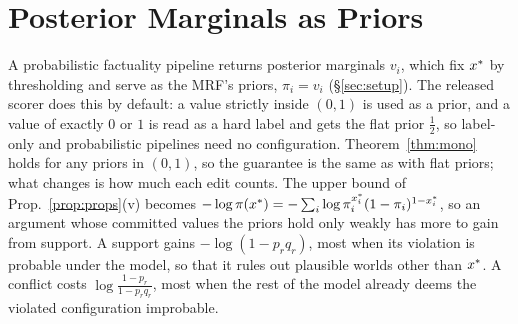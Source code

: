 \section{Posterior Marginals as Priors}
\label{app:twostage}

A probabilistic factuality pipeline returns posterior marginals $v_i$, which fix $x^{\ast}$ by
thresholding and serve as the MRF's priors, $\pi_i=v_i$ (\S\ref{sec:setup}). The released scorer
does this by default: a value strictly inside $(0,1)$ is used as a prior, and a value of exactly $0$
or $1$ is read as a hard label and gets the flat prior $\frac12$, so label-only and probabilistic
pipelines need no configuration. Theorem~\ref{thm:mono} holds for any priors in $(0,1)$, so the
guarantee is the same as with flat priors; what changes is how much each edit counts. The upper bound of Prop.~\ref{prop:props}(v) becomes
$-\log\pi(x^{\ast})=-\sum_i\log\pi_i^{x^{\ast}_i}(1-\pi_i)^{1-x^{\ast}_i}$, so an argument whose committed values
the priors hold only weakly has more to gain from support. A support gains $-\log(1-p_rq_r)$, most
when its violation is probable under the model, so that it rules out plausible worlds other than
$x^{\ast}$. A conflict costs $\log\frac{1-p_r}{1-p_rq_r}$, most when the rest of the model already
deems the violated configuration improbable.

